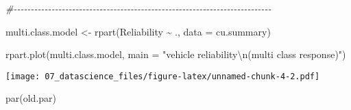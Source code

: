 \documentclass[
]{book}
\newenvironment{Shaded}{\begin{snugshade}}{\end{snugshade}}
\newcommand{\AttributeTok}[1]{\textcolor[rgb]{0.77,0.63,0.00}{#1}}
\newcommand{\CommentTok}[1]{\textcolor[rgb]{0.56,0.35,0.01}{\textit{#1}}}
\newcommand{\FunctionTok}[1]{\textcolor[rgb]{0.00,0.00,0.00}{#1}}
\newcommand{\NormalTok}[1]{#1}
\newcommand{\OtherTok}[1]{\textcolor[rgb]{0.56,0.35,0.01}{#1}}
\newcommand{\SpecialCharTok}[1]{\textcolor[rgb]{0.00,0.00,0.00}{#1}}
\newcommand{\StringTok}[1]{\textcolor[rgb]{0.31,0.60,0.02}{#1}}
\begin{document}
\begin{Shaded}
\begin{Highlighting}[]
\CommentTok{\#{-}{-}{-}{-}{-}{-}{-}{-}{-}{-}{-}{-}{-}{-}{-}{-}{-}{-}{-}{-}{-}{-}{-}{-}{-}{-}{-}{-}{-}{-}{-}{-}{-}{-}{-}{-}{-}{-}{-}{-}{-}{-}{-}{-}{-}{-}{-}{-}{-}{-}{-}{-}{-}{-}{-}{-}{-}{-}{-}{-}{-}{-}{-}{-}{-}{-}{-}{-}{-}{-}{-}{-}{-}{-}{-}}

\NormalTok{multi.class.model }\OtherTok{\textless{}{-}} \FunctionTok{rpart}\NormalTok{(Reliability }\SpecialCharTok{\textasciitilde{}}\NormalTok{ ., }\AttributeTok{data =}\NormalTok{ cu.summary)}

\FunctionTok{rpart.plot}\NormalTok{(multi.class.model,}
           \AttributeTok{main =} \StringTok{"vehicle reliability}\SpecialCharTok{\textbackslash{}n}\StringTok{(multi class response)"}\NormalTok{)}
\end{Highlighting}
\end{Shaded}

\texttt{[image: 07\_datascience\_files/figure-latex/unnamed-chunk-4-2.pdf]}

\begin{Shaded}
\begin{Highlighting}[]
\FunctionTok{par}\NormalTok{(old.par)}
\end{Highlighting}
\end{Shaded}


  
\end{document}
